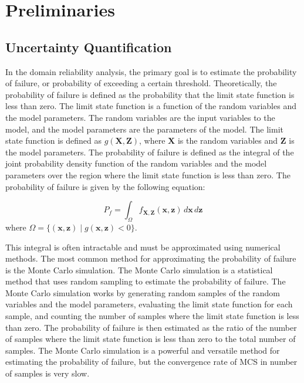 \chapter{Preliminaries}
\label{ch:preliminaries}

\section{Uncertainty Quantification}

In the domain reliability analysis, the primary goal is to estimate the probability of failure, or probability of exceeding a certain threshold. Theoretically, the probability of failure is defined as the probability that the limit state function is less than zero. The limit state function is a function of the random variables and the model parameters. The random variables are the input variables to the model, and the model parameters are the parameters of the model. The limit state function is defined as $g(\mathbf{X}, \mathbf{Z})$, where $\mathbf{X}$ is the random variables and $\mathbf{Z}$ is the model parameters. The probability of failure is defined as the integral of the joint probability density function of the random variables and the model parameters over the region where the limit state function is less than zero. The probability of failure is given by the following equation: 

\begin{equation}
P_f = \int_{\Omega} f_{\mathbf{X}, \mathbf{Z}}(\mathbf{x}, \mathbf{z}) \, d\mathbf{x} \, d\mathbf{z}
\end{equation}
where $\Omega = \{ (\mathbf{x}, \mathbf{z}) \mid g(\mathbf{x}, \mathbf{z}) < 0 \}$.

This integral is often intractable and must be approximated using numerical methods. The most common method for approximating the probability of failure is the Monte Carlo simulation. The Monte Carlo simulation is a statistical method that uses random sampling to estimate the probability of failure. The Monte Carlo simulation works by generating random samples of the random variables and the model parameters, evaluating the limit state function for each sample, and counting the number of samples where the limit state function is less than zero. The probability of failure is then estimated as the ratio of the number of samples where the limit state function is less than zero to the total number of samples. The Monte Carlo simulation is a powerful and versatile method for estimating the probability of failure, but the convergence rate of MCS in number of samples is very slow. 

